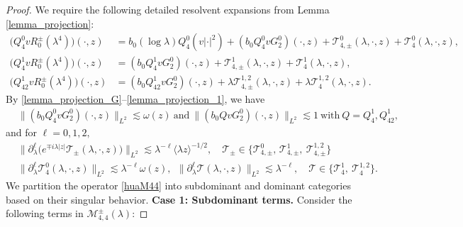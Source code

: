 \documentclass[reqno]{amsart}
\numberwithin{equation}{section}
\begin{document}
\begin{proof} 
	We require the following detailed  resolvent expansions from  Lemma \ref{lemma_projection}:
	\begin{equation}\label{eq:resolvent_decomp}  \begin{split}
			\bigl(Q_4^0 v R_0^\pm(\lambda^4)\bigr)(\cdot,z) &=  b_0 (\log \lambda) Q_4^0(v|\cdot|^2) + (b_0 Q_4^0 v G_2^0)( \cdot,z) + \mathcal{T}_{4,\pm}^0(\lambda, \cdot,z)+\mathcal{T}_{4}^0(\lambda, \cdot,z),  \\
			\bigl(Q_{4}^1v R_0^\pm(\lambda^4)\bigr)(\cdot,z) & =(b_0 Q_{4}^1 v G_2^0)( \cdot,z) + \mathcal{T}_{4,\pm}^{1}(\lambda, \cdot,z)+\mathcal{T}_{4}^{1}(\lambda, \cdot,z), \\
			\bigl(Q_{42}^1v	R_0^\pm(\lambda^4)\bigr)(\cdot,z) &=  (b_0 Q_{42}^1v G_2^0)( \cdot,z) + \lambda\mathcal{T}_{4,\pm}^{1,2}(\lambda, \cdot,z)+\lambda\mathcal{T}_{4}^{1,2}(\lambda, \cdot,z).
		\end{split}
	\end{equation}  
	By \eqref{lemma_projection_G}--\eqref{lemma_projection_1}, we have \begin{equation}\label{eq:E_bound}  
		\begin{split}   
			&\|(b_0 Q_4^0 v G_2^0)(\cdot, z)\|_{L^2} \lesssim \omega(z) \   \text{and}\ \|(b_0 Qv G_2^0)(\cdot, z)\|_{L^2} \lesssim1\  \text{with}\ Q=Q_{4}^1, Q_{42}^1,
		\end{split}  
	\end{equation}      and for $\ell=0,1,2,$
    \begin{equation}\label{eq:E_bound-2} 
    \begin{split}
    &\big\| \partial_\lambda^\ell \bigl( e^{\mp i\lambda|z|}\mathcal{T}_{\pm}(\lambda, \cdot, z) \bigr) \big\|_{L^2}  \lesssim \lambda^{-\ell} \langle \lambda z \rangle^{-1/2} , \quad \mathcal{T}_\pm \in \{  \mathcal{T}_{4, \pm}^0, \, \mathcal{T}_{4, \pm}^{1},\ \mathcal{T}_{4, \pm}^{1,2}\}\\ 
   & \big\| \partial_\lambda^\ell \mathcal{T}_4^0(\lambda, \cdot, z) \big\|_{L^2} \lesssim \lambda^{-\ell}\omega(z),\ \ 
    \big\| \partial_\lambda^\ell \mathcal{T}(\lambda, \cdot, z) \big\|_{L^2} \lesssim \lambda^{-\ell}, \quad \mathcal{T} \in \{  \mathcal{T}_4^{1},\ \mathcal{T}_4^{1,2}\}.\end{split}
	\end{equation}
	We partition the operator \eqref{huaM44} into subdominant and dominant categories based on their singular behavior.
	\vskip0.2cm
	\textbf{Case 1: Subdominant terms.} 
		Consider the following terms in $\mathcal{M}_{4,4}^{\pm}(\lambda)$:   

\end{proof}
\end{document}

